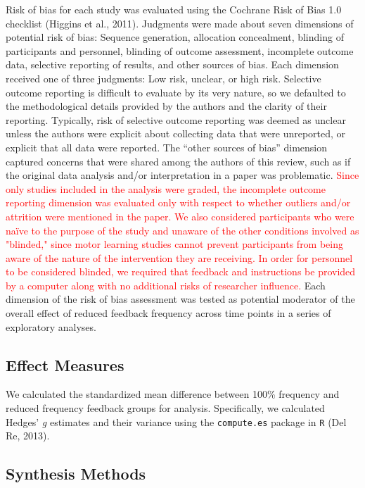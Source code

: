 \documentclass[
  english,
  man, donotrepeattitle,mask,floatsintext]{apa7}
\begin{document}
Risk of bias for each study was evaluated using the Cochrane Risk of Bias 1.0 checklist (Higgins et al., 2011). Judgments were made about seven dimensions of potential risk of bias: Sequence generation, allocation concealment, blinding of participants and personnel, blinding of outcome assessment, incomplete outcome data, selective reporting of results, and other sources of bias. Each dimension received one of three judgments: Low risk, unclear, or high risk. Selective outcome reporting is difficult to evaluate by its very nature, so we defaulted to the methodological details provided by the authors and the clarity of their reporting. Typically, risk of selective outcome reporting was deemed as unclear unless the authors were explicit about collecting data that were unreported, or explicit that all data were reported. The ``other sources of bias'' dimension captured concerns that were shared among the authors of this review, such as if the original data analysis and/or interpretation in a paper was problematic. \textcolor{red} {Since only studies included in the analysis were graded, the incomplete outcome reporting dimension was evaluated only with respect to whether outliers and/or attrition were mentioned in the paper. We also considered participants who were naïve to the purpose of the study and unaware of the other conditions involved as "blinded," since motor learning studies cannot prevent participants from being aware of the nature of the intervention they are receiving. In order for personnel to be considered blinded, we required that feedback and instructions be provided by a computer along with no additional risks of researcher influence.} Each dimension of the risk of bias assessment was tested as potential moderator of the overall effect of reduced feedback frequency across time points in a series of exploratory analyses.

\hypertarget{effect-measures}{%
\subsection{Effect Measures}\label{effect-measures}}

We calculated the standardized mean difference between 100\% frequency and reduced frequency feedback groups for analysis. Specifically, we calculated Hedges' \emph{g} estimates and their variance using the \texttt{compute.es} package in \texttt{R} (Del Re, 2013).

\hypertarget{synthesis-methods}{%
\subsection{Synthesis Methods}\label{synthesis-methods}}
\end{document}
